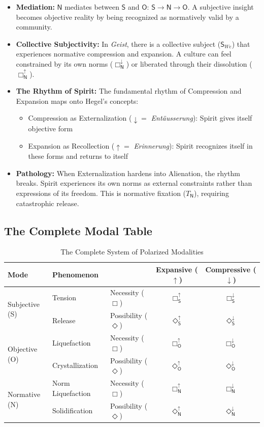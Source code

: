 \documentclass[12pt]{book}
\newcommand{\SBoxUp}{\Box_{\mathsf{S}}^{\uparrow}}
\newcommand{\SBoxDown}{\Box_{\mathsf{S}}^{\downarrow}}
\newcommand{\SDiaUp}{\Diamond_{\mathsf{S}}^{\uparrow}}
\newcommand{\SDiaDown}{\Diamond_{\mathsf{S}}^{\downarrow}}
\newcommand{\OBoxUp}{\Box_{\mathsf{O}}^{\uparrow}}
\newcommand{\OBoxDown}{\Box_{\mathsf{O}}^{\downarrow}}
\newcommand{\ODiaUp}{\Diamond_{\mathsf{O}}^{\uparrow}}
\newcommand{\ODiaDown}{\Diamond_{\mathsf{O}}^{\downarrow}}
\newcommand{\NBoxUp}{\Box_{\mathsf{N}}^{\uparrow}}
\newcommand{\NBoxDown}{\Box_{\mathsf{N}}^{\downarrow}}
\newcommand{\NDiaUp}{\Diamond_{\mathsf{N}}^{\uparrow}}
\newcommand{\NDiaDown}{\Diamond_{\mathsf{N}}^{\downarrow}}
\begin{document}
\begin{itemize}
\item \textbf{Mediation:} $\mathsf{N}$ mediates between $\mathsf{S}$ and $\mathsf{O}$: $\mathsf{S} \rightarrow \mathsf{N} \rightarrow \mathsf{O}$. A subjective insight becomes objective reality by being recognized as normatively valid by a community.

\item \textbf{Collective Subjectivity:} In \textit{Geist}, there is a collective subject ($\mathsf{S}_{We}$) that experiences normative compression and expansion. A culture can feel constrained by its own norms ($\NBoxDown$) or liberated through their dissolution ($\NBoxUp$).

\item \textbf{The Rhythm of Spirit:} The fundamental rhythm of Compression and Expansion maps onto Hegel's concepts:
\begin{itemize}
\item Compression as Externalization ($\downarrow = $ \emph{Entäusserung}): Spirit gives itself objective form
\item Expansion as Recollection ($\uparrow = $ \emph{Erinnerung}): Spirit recognizes itself in these forms and returns to itself
\end{itemize}

\item \textbf{Pathology:} When Externalization hardens into Alienation, the rhythm breaks. Spirit experiences its own norms as external constraints rather than expressions of its freedom. This is normative fixation ($T_{\mathsf{N}}$), requiring catastrophic release.
\end{itemize}

\subsection{The Complete Modal Table}

\begin{table}[H]
 \centering
 \begin{tabular}{lllcc}
\toprule
Mode & Phenomenon & & Expansive ($\uparrow$) & Compressive ($\downarrow$) \\
\midrule
\multirow{2}{*}{Subjective (S)} & Tension & Necessity ($\Box$) & $\SBoxUp$ & $\SBoxDown$ \\
& Release & Possibility ($\Diamond$) & $\SDiaUp$ & $\SDiaDown$ \\
\midrule
\multirow{2}{*}{Objective (O)} & Liquefaction & Necessity ($\Box$) & $\OBoxUp$ & $\OBoxDown$ \\
& Crystallization & Possibility ($\Diamond$) & $\ODiaUp$ & $\ODiaDown$ \\
\midrule
\multirow{2}{*}{Normative (N)} & Norm Liquefaction & Necessity ($\Box$) & $\NBoxUp$ & $\NBoxDown$ \\
& Solidification & Possibility ($\Diamond$) & $\NDiaUp$ & $\NDiaDown$ \\
\bottomrule
\end{tabular}
\caption{The Complete System of Polarized Modalities}
\label{tab:complete_modalities}
\end{table}
\end{document}
